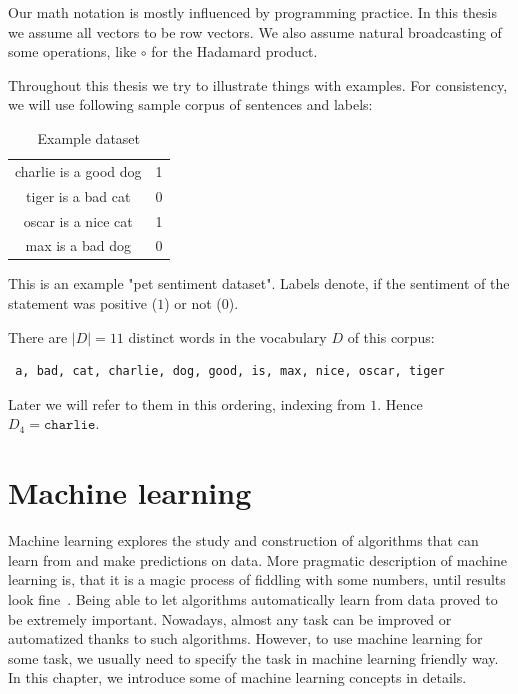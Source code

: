     Our math notation is mostly influenced by programming practice.
    In this thesis we assume all vectors to be row vectors.
    We also assume natural broadcasting of some operations, like $\circ$ for the Hadamard product.
    
    Throughout this thesis we try to illustrate things with examples. 
    For consistency, we will use following sample corpus of sentences and labels:
    
    \begin{table}[h]
        \centering
        \begin{tabular}{c|c}
        \hline
            charlie is a good dog & 1 \\
            tiger is a bad cat & 0 \\
            oscar is a nice cat & 1 \\
            max is a bad dog & 0 \\
        \end{tabular}
        \caption{Example dataset}
        \label{tab:example:dataset}

    \end{table}
    
    This is an example "pet sentiment dataset". Labels denote, if the sentiment of the statement was positive ($1$) or not ($0$). 

    There are $|D|=11$ distinct words in the vocabulary $D$ of this corpus: 
    \begin{verbatim} a, bad, cat, charlie, dog, good, is, max, nice, oscar, tiger \end{verbatim}
    
    Later we will refer to them in this ordering, indexing from $1$. 
    Hence $D_4=\mathtt{charlie}$.


\section{Machine learning}
    
    Machine learning explores the study and construction of algorithms that can learn from and make predictions on data.
    More pragmatic description of machine learning is, that it is a magic process of fiddling with some numbers, until results look fine~\cite{boza2018}. 
    Being able to let algorithms automatically learn from data proved to be extremely important.
    Nowadays, almost any task can be improved or automatized thanks to such algorithms. 
    However, to use machine learning for some task, we usually need to specify the task in machine learning friendly way.    
    In this chapter, we introduce some of machine learning concepts in details.


